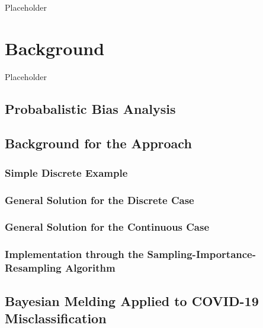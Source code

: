 \documentclass[12pt,twoside]{smiththesis}
\begin{document}
Placeholder

\hypertarget{background}{%
\chapter{Background}\label{background}}

Placeholder

\hypertarget{probabalistic-bias-analysis}{%
\section{Probabalistic Bias Analysis}\label{probabalistic-bias-analysis}}

\hypertarget{background-for-the-approach}{%
\section{Background for the Approach}\label{background-for-the-approach}}

\hypertarget{simple-discrete-example}{%
\subsection{Simple Discrete Example}\label{simple-discrete-example}}

\hypertarget{general-solution-for-the-discrete-case}{%
\subsection{General Solution for the Discrete Case}\label{general-solution-for-the-discrete-case}}

\hypertarget{general-solution-for-the-continuous-case}{%
\subsection{General Solution for the Continuous Case}\label{general-solution-for-the-continuous-case}}

\hypertarget{implementation-through-the-sampling-importance-resampling-algorithm}{%
\subsection{Implementation through the Sampling-Importance-Resampling Algorithm}\label{implementation-through-the-sampling-importance-resampling-algorithm}}

\hypertarget{bayesian-melding-applied-to-covid-19-misclassification}{%
\section{Bayesian Melding Applied to COVID-19 Misclassification}\label{bayesian-melding-applied-to-covid-19-misclassification}}
\end{document}
